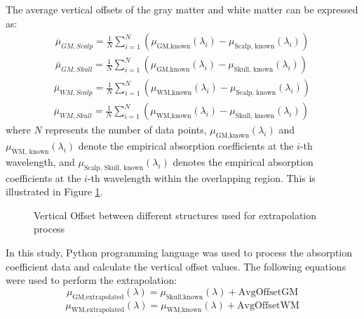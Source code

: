 \documentclass[journal,twoside,web]{ieeecolor}
\begin{document}
The average vertical offsets of the gray matter and white matter can be expressed as:
\begin{equation}
    \label{eq:AvgGM}
    \begin{aligned}
    \overline{\mu}_{GM, Scalp} = \frac{1}{N} \sum_{i=1}^{N} (\mu_{\text{GM,known}}(\lambda_i) - \mu_{\text{Scalp, known}}(\lambda_i)) \\
    \overline{\mu}_{GM, Skull} = \frac{1}{N} \sum_{i=1}^{N} (\mu_{\text{GM,known}}(\lambda_i) - \mu_{\text{Skull, known}}(\lambda_i))
    \end{aligned}
\end{equation}
\begin{equation}
    \label{eq:AvgWM}
    \begin{aligned}
        \overline{\mu}_{WM, Scalp} = \frac{1}{N} \sum_{i=1}^{N} (\mu_{\text{WM,known}}(\lambda_i) - \mu_{\text{Scalp, known}}(\lambda_i)) \\
        \overline{\mu}_{WM, Skull} = \frac{1}{N} \sum_{i=1}^{N} (\mu_{\text{WM,known}}(\lambda_i) - \mu_{\text{Skull, known}}(\lambda_i))
    \end{aligned}
\end{equation}
where \( N \) represents the number of data points, \( \mu_{\text{GM,known}}(\lambda_i) \) and \( \mu_{\text{WM, known}}(\lambda_i) \) 
denote the empirical absorption coefficients at the \( i \)-th wavelength, and \( \mu_{\text{Scalp, Skull, known}}(\lambda_i) \) denotes 
the empirical absorption coefficients at the \( i \)-th wavelength within the overlapping region. This is illustrated in Figure \ref{fig:Overlap}.

\begin{figure}[!htb]
    \caption{\label{fig:Overlap} Vertical Offset between different structures used for extrapolation process}
\end{figure}
In this study, Python programming language was used to process the absorption coefficient data and calculate the vertical offset values. 
The following equations were used to perform the extrapolation:
\begin{equation}
    \label{eq:GMextrapolate}
    \mu_{\text{GM,extrapolated}}(\lambda) = \mu_{\text{Skull,known}}(\lambda) + \text{AvgOffsetGM}
\end{equation}
\begin{equation}
    \label{eq:WMextrapolate}
    \mu_{\text{WM,extrapolated}}(\lambda) = \mu_{\text{WM,known}}(\lambda) + \text{AvgOffsetWM}
\end{equation}
\end{document}

